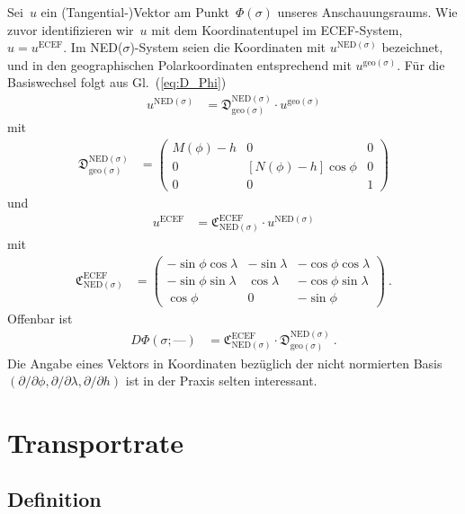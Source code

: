 \documentclass[10pt,a4paper]{article}
\newcommand{\nul}{\textrm{---}}
\begin{document}
Sei~$u$ ein (Tangential-)Vektor am Punkt~$\Phi(\sigma)$ unseres Anschauungsraums.
Wie zuvor identifizieren wir~$u$ mit dem Koordinatentupel im ECEF-System, $u=u^{\mathrm{ECEF}}$.
Im NED($\sigma$)-System seien die Koordinaten mit $u^{\mathrm{NED}(\sigma)}$ bezeichnet, und in den geographischen Polarkoordinaten entsprechend mit $u^{\mathrm{geo}(\sigma)}$.
Für die Basiswechsel folgt aus Gl.~(\ref{eq:D_Phi})
\begin{align}
	u^{\mathrm{NED}(\sigma)} &= 
	\mathfrak{D}^{\mathrm{NED}(\sigma)}_{\mathrm{geo}(\sigma)}
	\cdot
	u^{\mathrm{geo}(\sigma)}
\end{align}
mit 
\begin{align}
	\mathfrak{D}^{\mathrm{NED}(\sigma)}_{\mathrm{geo}(\sigma)} &= 
	\begin{pmatrix}
		M(\phi) - h & 0 & 0 \\
		0 & [N(\phi) - h]\cos\phi & 0 \\
		0 & 0 & 1				
	\end{pmatrix}
\end{align}
und
\begin{align}
	u^{\mathrm{ECEF}} &= 
	\mathfrak{C}^{\mathrm{ECEF}}_{\mathrm{NED}(\sigma)}
	\cdot
	u^{\mathrm{NED}(\sigma)}
\end{align}
mit 
\begin{align}
	\mathfrak{C}^{\mathrm{ECEF}}_{\mathrm{NED}(\sigma)} &= 
	\begin{pmatrix}
		-\sin\phi\cos\lambda & -\sin\lambda & -\cos\phi\cos\lambda\\
		-\sin\phi\sin\lambda & \cos\lambda & -\cos\phi\sin\lambda\\
		\cos\phi & 0 & -\sin\phi
	\end{pmatrix}
	\ .
\end{align}
Offenbar ist
\begin{align}
\label{eq:D_Phi_decomposition}
	D\Phi(\sigma; \nul)
	&=
	\mathfrak{C}^{\mathrm{ECEF}}_{\mathrm{NED}(\sigma)}
	\cdot
	\mathfrak{D}^{\mathrm{NED}(\sigma)}_{\mathrm{geo}(\sigma)}
	\ .
\end{align}
Die Angabe eines Vektors in Koordinaten bezüglich der nicht normierten Basis $(\partial/\partial\phi,\partial/\partial\lambda,\partial/\partial h)$ ist in der Praxis selten interessant.


\section{Transportrate}

\subsection{Definition}
\end{document}
